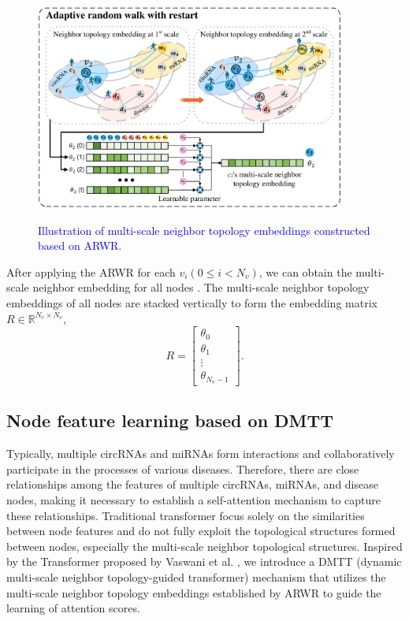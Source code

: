 \documentclass{bioinfo}
\begin{document}
\begin{methods}
\begin{figure}[t]
	\centering
	\includegraphics[width=4in]{fig/visio3.pdf}\\
	\vspace{0.2cm}
	\caption{\textcolor{blue}{Illustration of multi-scale neighbor topology embeddings constructed based on ARWR.}}
	\label{fig:visio3}
	\vspace{0.1cm}
\end{figure}

After applying the ARWR for each $v_i(0 \leqslant i < N_v)$, we can obtain the multi-scale neighbor embedding for all nodes . The multi-scale neighbor topology embeddings of all nodes are stacked vertically to form the embedding matrix $R \in \mathbb{R}^{N_v \times N_v}$,
\begin{equation}
	R = \left[\begin{array}{cccc}
		\theta _0\\
		\theta _1\\
		\vdots\\
		\theta _{N_v-1}
	\end{array}\right].
\end{equation}

\vspace{0.3cm}


\subsection{Node feature learning based on DMTT}
Typically, multiple circRNAs and miRNAs form interactions and collaboratively participate in the processes of various diseases. Therefore, there are close relationships among the features of multiple circRNAs, miRNAs, and disease nodes, making it necessary to establish a self-attention mechanism to capture these relationships. Traditional transformer focus solely on the similarities between node features and do not fully exploit the topological structures formed between nodes, especially the multi-scale neighbor topological structures. Inspired by the Transformer proposed by Vaswani et al. \cite{vaswani2017attention}, we introduce a DMTT (dynamic multi-scale neighbor topology-guided transformer) mechanism that utilizes the multi-scale neighbor topology embeddings established by ARWR to guide the learning of attention scores.


\end{methods}
\end{document}

